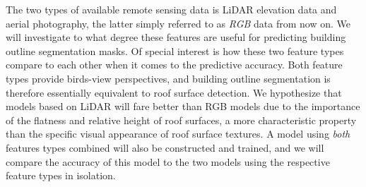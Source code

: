 The two types of available remote sensing data is LiDAR elevation data and aerial photography, the latter simply referred to as \textit{RGB} data from now on.
We will investigate to what degree these features are useful for predicting building outline segmentation masks.
Of special interest is how these two feature types compare to each other when it comes to the predictive accuracy.
Both feature types provide birds-view perspectives, and building outline segmentation is therefore essentially equivalent to roof surface detection.
We hypothesize that models based on LiDAR will fare better than RGB models due to the importance of the flatness and relative height of roof surfaces, a more characteristic property than the specific visual appearance of roof surface textures.
A model using \textit{both} features types combined will also be constructed and trained, and we will compare the accuracy of this model to the two models using the respective feature types in isolation.
